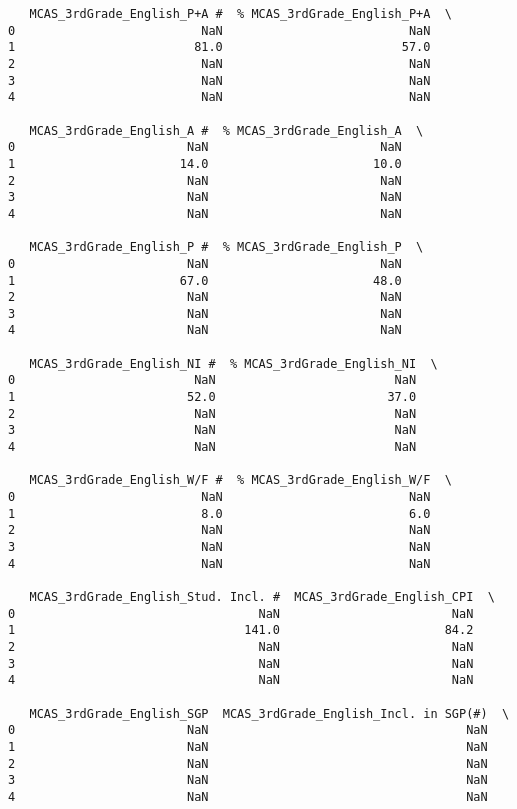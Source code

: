 \documentclass[11pt]{article}
\begin{document}
\begin{verbatim}
   MCAS_3rdGrade_English_P+A #  % MCAS_3rdGrade_English_P+A  \
0                          NaN                          NaN   
1                         81.0                         57.0   
2                          NaN                          NaN   
3                          NaN                          NaN   
4                          NaN                          NaN   

   MCAS_3rdGrade_English_A #  % MCAS_3rdGrade_English_A  \
0                        NaN                        NaN   
1                       14.0                       10.0   
2                        NaN                        NaN   
3                        NaN                        NaN   
4                        NaN                        NaN   

   MCAS_3rdGrade_English_P #  % MCAS_3rdGrade_English_P  \
0                        NaN                        NaN   
1                       67.0                       48.0   
2                        NaN                        NaN   
3                        NaN                        NaN   
4                        NaN                        NaN   

   MCAS_3rdGrade_English_NI #  % MCAS_3rdGrade_English_NI  \
0                         NaN                         NaN   
1                        52.0                        37.0   
2                         NaN                         NaN   
3                         NaN                         NaN   
4                         NaN                         NaN   

   MCAS_3rdGrade_English_W/F #  % MCAS_3rdGrade_English_W/F  \
0                          NaN                          NaN   
1                          8.0                          6.0   
2                          NaN                          NaN   
3                          NaN                          NaN   
4                          NaN                          NaN   

   MCAS_3rdGrade_English_Stud. Incl. #  MCAS_3rdGrade_English_CPI  \
0                                  NaN                        NaN   
1                                141.0                       84.2   
2                                  NaN                        NaN   
3                                  NaN                        NaN   
4                                  NaN                        NaN   

   MCAS_3rdGrade_English_SGP  MCAS_3rdGrade_English_Incl. in SGP(#)  \
0                        NaN                                    NaN   
1                        NaN                                    NaN   
2                        NaN                                    NaN   
3                        NaN                                    NaN   
4                        NaN                                    NaN   


\end{verbatim}
\end{document}
